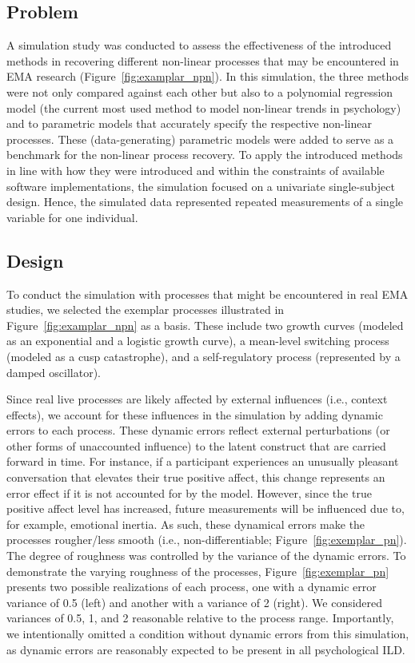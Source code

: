 \documentclass[man, floatsintext]{apa7}
\begin{document}
\subsection{Problem}

A simulation study was conducted to assess the effectiveness of the introduced
methods in recovering different non-linear processes that may be encountered in
EMA research (Figure~\ref{fig:examplar_npn}). In this simulation, the three
methods were not only compared against each other but also to a polynomial
regression model (the current most used method to model non-linear trends in
psychology) and to parametric models that accurately specify the respective
non-linear processes. These (data-generating) parametric models were added to
serve as a benchmark for the non-linear process recovery. To apply the
introduced methods in line with how they were introduced and within the
constraints of available software implementations, the simulation focused on a
univariate single-subject design. Hence, the simulated data represented
repeated measurements of a single variable for one individual.

\subsection{Design}

To conduct the simulation with processes that might be encountered in real EMA
studies, we selected the exemplar processes illustrated in
Figure~\ref{fig:examplar_npn} as a basis. These include two growth curves
(modeled as an exponential and a logistic growth curve), a mean-level switching
process (modeled as a cusp catastrophe), and a self-regulatory process
(represented by a damped oscillator).

Since real live processes are likely affected by external influences (i.e.,
context effects), we account for these influences in the simulation by adding
dynamic errors to each process. These dynamic errors reflect external
perturbations (or other forms of unaccounted influence) to the latent construct
that are carried forward in time. For instance, if a participant experiences an
unusually pleasant conversation that elevates their true positive affect, this
change represents an error effect if it is not accounted for by the model.
However, since the true positive affect level has increased, future
measurements will be influenced due to, for example, emotional inertia. As
such, these dynamical errors make the processes rougher/less smooth (i.e.,
non-differentiable; Figure~\ref{fig:exemplar_pn}). The degree of roughness was
controlled by the variance of the dynamic errors. To demonstrate the varying
roughness of the processes, Figure~\ref{fig:exemplar_pn} presents two possible
realizations of each process, one with a dynamic error variance of 0.5 (left)
and another with a variance of 2 (right). We considered variances of 0.5, 1,
and 2 reasonable relative to the process range. Importantly, we intentionally
omitted a condition without dynamic errors from this simulation, as dynamic
errors are reasonably expected to be present in all psychological ILD\@.
\end{document}
